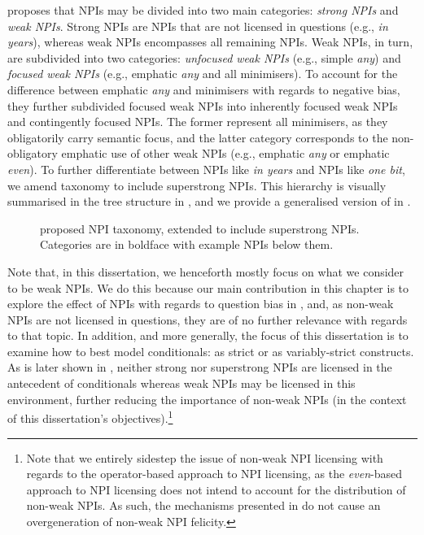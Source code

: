 \textcite{Jeong2021,Jeong2022} proposes that NPIs may be divided into two main categories: \textit{strong NPIs} and \textit{weak NPIs}. Strong NPIs are NPIs that are not licensed in questions (e.g., \textit{in years}), whereas weak NPIs encompasses all remaining NPIs. Weak NPIs, in turn, are subdivided into two categories: \textit{unfocused weak NPIs} (e.g., simple \textit{any}) and \textit{focused weak NPIs} (e.g., emphatic \textit{any} and all minimisers). To account for the difference between emphatic \textit{any} and minimisers with regards to negative bias, they further subdivided focused weak NPIs into inherently focused weak NPIs and contingently focused NPIs. The former represent all minimisers, as they obligatorily carry semantic focus, and the latter category corresponds to the non-obligatory emphatic use of other weak NPIs (e.g., emphatic \textit{any} or emphatic \textit{even}). To further differentiate between NPIs like \textit{in years} and NPIs like \textit{one bit}, we amend  taxonomy to include superstrong NPIs. This hierarchy is visually summarised in the tree structure in , and we provide a generalised version of  in .
\begin{figure}[!htb]
    \centering
    \resizebox{\textwidth}{!}{}
    \caption{ proposed NPI taxonomy, extended to include superstrong NPIs. Categories are in boldface with example NPIs below them.}
\end{figure}
\begin{table}[!htb]
\end{table}

\noindent Note that, in this dissertation, we henceforth mostly focus on what we consider to be weak NPIs. We do this because our main contribution in this chapter is to explore the effect of NPIs with regards to question bias in , and, as non-weak NPIs are not licensed in questions, they are of no further relevance with regards to that topic. In addition, and more generally, the focus of this dissertation is to examine how to best model conditionals: as strict or as variably-strict constructs. As is later shown in , neither strong nor superstrong NPIs are licensed in the antecedent of conditionals whereas weak NPIs may be licensed in this environment, further reducing the importance of non-weak NPIs (in the context of this dissertation's objectives).\footnote{Note that we entirely sidestep the issue of non-weak NPI licensing with regards to the operator-based approach to NPI licensing, as the \textit{even}-based approach to NPI licensing does not intend to account for the distribution of non-weak NPIs. As such, the mechanisms presented in  do not cause an overgeneration of non-weak NPI felicity.}


